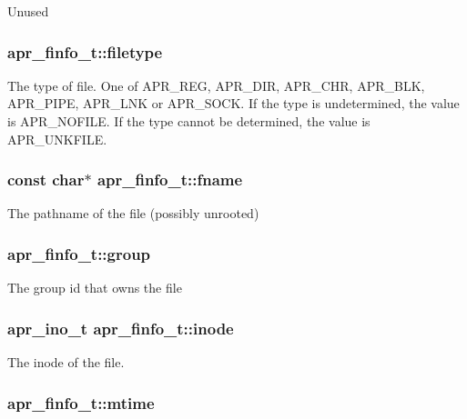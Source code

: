 Unused \hypertarget{structapr__finfo__t_a274ae0dd60b59182c2e0134bc9a09a20}{
\subsubsection[{filetype}]{ apr\-\_\-finfo\-\_\-t\-::filetype}}\label{structapr__finfo__t_a274ae0dd60b59182c2e0134bc9a09a20}
The type of file. One of A\-P\-R\-\_\-\-R\-E\-G, A\-P\-R\-\_\-\-D\-I\-R, A\-P\-R\-\_\-\-C\-H\-R, A\-P\-R\-\_\-\-B\-L\-K, A\-P\-R\-\_\-\-P\-I\-P\-E, A\-P\-R\-\_\-\-L\-N\-K or A\-P\-R\-\_\-\-S\-O\-C\-K. If the type is undetermined, the value is A\-P\-R\-\_\-\-N\-O\-F\-I\-L\-E. If the type cannot be determined, the value is A\-P\-R\-\_\-\-U\-N\-K\-F\-I\-L\-E. \hypertarget{structapr__finfo__t_acfed83ab2943ee7a58a215aa1cfd9e47}{
\subsubsection[{fname}]{\setlength{\rightskip}{0pt plus 5cm}const char$\ast$ apr\-\_\-finfo\-\_\-t\-::fname}}\label{structapr__finfo__t_acfed83ab2943ee7a58a215aa1cfd9e47}
The pathname of the file (possibly unrooted) \hypertarget{structapr__finfo__t_a15c9c056330308de4dafb3826a9b02bc}{
\subsubsection[{group}]{ apr\-\_\-finfo\-\_\-t\-::group}}\label{structapr__finfo__t_a15c9c056330308de4dafb3826a9b02bc}
The group id that owns the file \hypertarget{structapr__finfo__t_a73aebb666ddc391d53a871802c27eed6}{
\subsubsection[{inode}]{\setlength{\rightskip}{0pt plus 5cm}apr\-\_\-ino\-\_\-t apr\-\_\-finfo\-\_\-t\-::inode}}\label{structapr__finfo__t_a73aebb666ddc391d53a871802c27eed6}
The inode of the file. \hypertarget{structapr__finfo__t_afc3bec0f6b3b10160428ba5602a41c60}{
\subsubsection[{mtime}]{ apr\-\_\-finfo\-\_\-t\-::mtime}}\label{structapr__finfo__t_afc3bec0f6b3b10160428ba5602a41c60}
